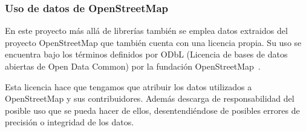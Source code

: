 \subsubsection{Uso de datos de OpenStreetMap}

En este proyecto más allá de librerías también se emplea datos extraidos del proyecto OpenStreetMap que también cuenta con una licencia propia. Su uso se encuentra bajo los términos definidos por ODbL (Licencia de bases de datos abiertas de Open Data Common) por la fundación OpenStreetMap~\cite{licenseOpenStreetMap}.

Esta licencia hace que tengamos que atribuir los datos utilizados a OpenStreetMap y sus contribuidores. Además descarga de responsabilidad del posible uso que se pueda hacer de ellos, desentendiéndose de posibles errores de precisión o integridad de los datos.

